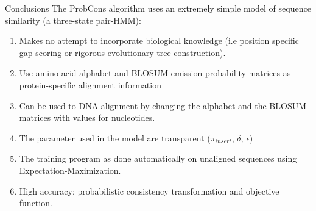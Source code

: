 \begin{frame}{Conclusions}
The ProbCons algorithm uses an extremely simple model of sequence similarity (a three-state pair-HMM):
    \begin{enumerate}
        \item Makes no attempt to incorporate biological knowledge (i.e position specific gap scoring or rigorous evolutionary tree construction).
        \item Use amino acid alphabet and BLOSUM emission probability matrices as protein-specific alignment information
        \item Can be used to DNA alignment by changing the alphabet and the BLOSUM matrices with values for nucleotides.
        \item The parameter used in the model are transparent ($\pi_{insert}$, $\delta$, $\epsilon$)
        \item The training program as done automatically on unaligned sequences using Expectation-Maximization.
        \item High accuracy: probabilistic consistency transformation and objective function. 
    \end{enumerate}
\end{frame}